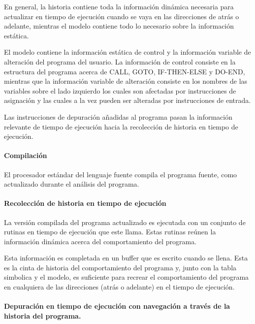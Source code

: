 \documentclass[12pt,legalpaper]{report}
\begin{document}
En general, la historia contiene toda la información dinámica necesaria para actualizar en tiempo de ejecución cuando se vaya en las direcciones de atrás o adelante, mientras el modelo contiene todo lo necesario sobre la información estática.

El modelo contiene la información estática de control y la información variable de alteración del programa del usuario.  La información de control consiste en la estructura del programa acerca de CALL, GOTO, IF-THEN-ELSE y DO-END, mientras que la información variable de alteración consiste en los nombres de las variables sobre el lado izquierdo los cuales son afectadas por instrucciones de asignación y las cuales a la vez pueden ser alteradas por instrucciones de entrada.

Las instrucciones de depuración añadidas al programa pasan la información relevante de tiempo de ejecución hacia  la recolección de historia en tiempo de ejecución.

				\paragraph{Compilación}

El procesador estándar del lenguaje fuente compila el programa fuente, como actualizado durante el análisis del programa.

				\paragraph[Recolección de historia]{Recolección de historia en tiempo de ejecución}

La versión compilada del programa actualizado es ejecutada con un conjunto de rutinas en tiempo de ejecución que este llama.  Estas rutinas reúnen la información dinámica acerca del comportamiento del programa.

Esta información es completada en un buffer que es escrito cuando se llena.  Esta es la cinta de historia del comportamiento del programa y, junto con la tabla simbolica y el modelo, es suficiente para recrear el comportamiento del programa en cualquiera de las direcciones (atrás o adelante) en el tiempo de ejecución.

				\paragraph[Historia del programa]{Depuración en tiempo de ejecución con navegación a través de la historia del programa.}
\end{document}
